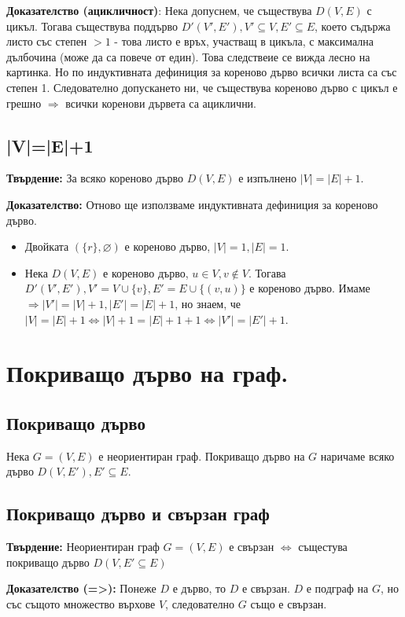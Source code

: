 \documentclass[fleqn,12pt]{article}
\begin{document}
\begin{flushleft}
\textbf{Доказателство (ацикличност)}: Нека допуснем, че съществува $D(V,E)$ с цикъл. Тогава съществува поддърво $D'(V', E'), V' \subseteq V, E' \subseteq E$, 
което съдържа листо със степен $>1$ - това листо е връх, участващ в цикъла, с максимална дълбочина (може да са повече от един). Това следствеие се вижда лесно на картинка. 
Но по индуктивната дефиниция за кореново дърво всички листа са със степен 1. Следователно допускането ни, че съществува кореново дърво с цикъл е грешно $\Rightarrow$ всички коренови дървета
са ациклични.
\vspace{10mm}

\subsection{|V|=|E|+1}
\textbf{Твърдение:} За всяко кореново дърво $D(V,E)$ е изпълнено $|V| = |E| + 1$.

\textbf{Доказателство:} Отново ще използваме индуктивната дефиниция за кореново дърво.
\begin{itemize}
	\item Двойката $(\{r\}, \varnothing)$ е кореново дърво, $|V| = 1, |E| = 1$.
	\item Нека $D(V,E)$ е кореново дърво, $u \in V, v \notin V$. Тогава $D'(V', E'), V' = V \cup \{v\}, E' = E \cup \{ (v, u)\}$ е кореново дърво.
	Имаме $\Rightarrow |V'| = |V| + 1, |E'| = |E| + 1$, но знаем, че $|V| = |E| + 1 \Leftrightarrow |V| + 1 = |E| + 1 + 1 \Leftrightarrow |V'| = |E'| + 1$.
\end{itemize}

\section{Покриващо дърво на граф.}
\subsection{Покриващо дърво}
Нека $G = (V, E)$ е неориентиран граф. Покриващо дърво на $G$ наричаме всяко дърво $D(V, E'), E' \subseteq E$.

\subsection{Покриващо дърво и свързан граф} 
\textbf{Твърдение:} Неориентиран граф $G = (V, E)$ е свързан $\Leftrightarrow $ същестува покриващо дърво $D(V, E' \subseteq E)$ 

\textbf{Доказателство (=>):} Понеже $D$ е дърво, то $D$ е свързан. $D$ е подграф на $G$, но със същото множество върхове $V$, следователно $G$ също е свързан.


\end{flushleft}
\end{document}
